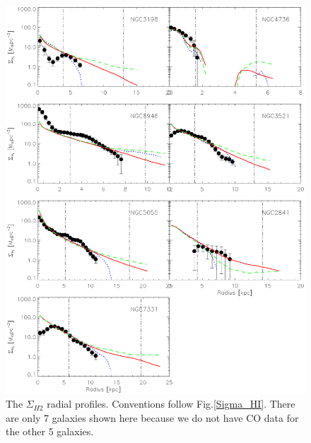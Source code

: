 \documentclass[12pt,preprint]{aastex}
\begin{document}
\begin{figure}
\begin{center}
\includegraphics[scale=0.8]{Sigma_H2.eps}  \caption{The $\Sigma_{H2}$ radial profiles. Conventions follow Fig.\ref{Sigma_HI}.  There are only 7 galaxies shown here because we do not have CO data for the other 5 galaxies. }
\label{Sigma_H2}
\end{center}
\end{figure}
\end{document}
